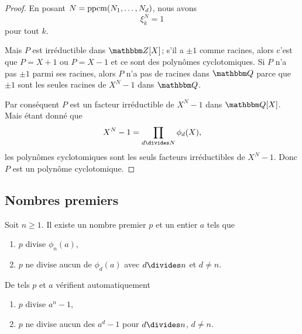 \begin{proof}
    En posant \( N=\operatorname{ppcm}(N_1,\ldots, N_d)\), nous avons
    \begin{equation}
        \xi_k^N=1
    \end{equation}
    pour tout \( k\).

    Mais \( P\) est irréductible dans \( \eZ[X]\); s'il a \( \pm 1\) comme racines, alors c'est que \( P=X+1\) ou \( P=X-1\) et ce sont des polynômes cyclotomiques. Si \( P\) n'a pas \( \pm 1\) parmi ses racines, alors \( P\) n'a pas de racines dans \( \eQ\) parce que \( \pm 1\) sont les seules racines de \( X^N-1\) dans \( \eQ\).

    Par conséquent \( P\) est un facteur irréductible de \( X^N-1\) dans \( \eQ[X]\). Mais étant donné que
    \begin{equation}
        X^N-1=\prod_{d\divides N}\phi_d(X),
    \end{equation}
    les polynômes cyclotomiques sont les seuls facteurs irréductibles de \( X^N-1\). Donc \( P\) est un polynôme cyclotomique.
\end{proof}

\subsection{Nombres premiers}

\begin{lemma}    \label{LemiAqLEn}
    Soit \( n\geq 1\). Il existe un nombre premier \( p\) et un entier \( a\) tels que
    \begin{enumerate}
        \item
            \( p\) divise \( \phi_n(a)\),
        \item
            \( p\) ne divise aucun de \( \phi_d(a)\) avec \( d\divides n\) et \( d\neq n\).
    \end{enumerate}
    De tels \( p\) et \( a\) vérifient automatiquement
    \begin{enumerate}
        \item
            \( p\) divise \( a^n-1\),
        \item
            \( p\) ne divise aucun des \( a^d-1\) pour \( d\divides n\), \( d\neq n\).
    \end{enumerate}
\end{lemma}

